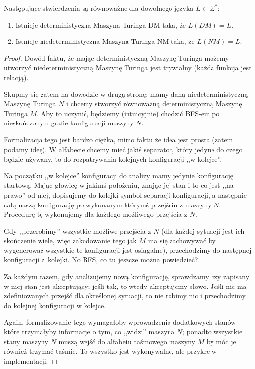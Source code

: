 \begin{theorem}
    Następujące stwierdzenia są równoważne dla dowolnego języka \( L \subset \Sigma^*\):
    \begin{enumerate}
        \item Istnieje deterministyczna Maszyna Turinga DM taka, że \(L(DM) = L\).
        \item Istnieje niedeterministyczna Maszyna Turinga NM taka, że \(L(NM) = L \). 
    \end{enumerate}
\end{theorem}

\begin{proof}
    Dowód faktu, że mając deterministyczną Maszynę Turinga możemy utworzyć niedeterministyczną Maszynę Turinga jest trywialny (każda funkcja jest relacją). 
    
    Skupmy się zatem na dowodzie w drugą stronę; mamy daną niedeterministyczną Maszynę Turinga \(N\) i chcemy stworzyć równoważną deterministyczną Maszynę Turinga \(M\). Aby to uczynić, będziemy (intuicyjnie) chodzić BFS-em po nieskończonym grafie konfiguracji maszyny \(N\).
    
    Formalizacja tego jest bardzo ciężka, mimo faktu że idea jest prosta (zatem podamy ideę). W alfabecie chcemy mieć jakiś separator, który jedyne do czego będzie używany, to do rozpatrywania kolejnych konfiguracji ,,w kolejce''. 
    
    Na początku ,,w kolejce'' konfiguracji do analizy mamy jedynie konfigurację startową. Mając głowicę w jakimś położeniu, znając jej stan i to co jest ,,na prawo'' od niej, dopisujemy do kolejki symbol separacji konfiguracji, a następnie całą naszą konfigurację po wykonanym którymś przejściu z maszyny \(N\). Procedurę tę wykonujemy dla każdego możliwego przejścia z \(N\). 
    
    Gdy ,,przerobimy'' wszystkie możliwe przejścia z \(N\) (dla każdej sytuacji jest ich skończenie wiele, więc zakodowanie tego jak \(M\) ma się zachowywać by wygenerować wszystkie te konfiguracji jest osiągalne), przechodzimy do następnej konfiguracji z~kolejki. No BFS, co tu jeszcze można powiedzieć?
    
    Za każdym razem, gdy analizujemy nową konfigurację, sprawdzamy czy zapisany w niej stan jest akceptujący; jeśli tak, to wtedy akceptujemy słowo. Jeśli nie ma zdefiniowanych przejść dla określonej sytuacji, to nie robimy nic i przechodzimy do kolejnej konfiguracji w kolejce.
    
    Again, formalizowanie tego wymagałoby wprowadzenia dodatkowych stanów które trzymałyby informacje o tym, co ,,widzi'' maszyna \(N\); ponadto wszystkie stany maszyny \(N\) muszą wejść do alfabetu taśmowego maszyny \(M\) by móc je również trzymać taśmie. To wszystko jest wykonywalne, ale przykre w implementacji. 
\end{proof}
